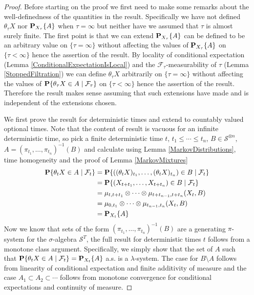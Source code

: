 \begin{proof}
Before starting on the proof we first need to make some remarks about
the well-definedness of the quantities in the result.  Specifically we
have not defined $\theta_\tau X$ nor $\sprobability{A}{X_\tau}$ when $\tau = \infty$ but neither have
we assumed that $\tau$ is almost surely finite.  The first point is that we
can extend $\sprobability{A}{X_\tau}$ can be defined to be an
arbitrary value on $\lbrace \tau = \infty \rbrace$ without affecting
the values of $\sprobability{A}{X_\tau}$ on $\lbrace \tau < \infty
\rbrace$ hence the assertion of the result.  By locality of
conditional expectation (Lemma \ref{ConditionalExpectationIsLocal})
and the $\mathcal{F}_\tau$-measurability of
$\tau$ (Lemma
\ref{StoppedFiltration}) we can define $\theta_\tau X$ arbitrarily on $\lbrace \tau =
\infty \rbrace$ without affecting the values of
$\cprobability{\mathcal{F}_\tau}{\theta_\tau X \in A}$ on $\lbrace \tau < \infty
\rbrace$ hence the assertion of the result.  Therefore the result
makes sense assuming that such extensions have made and is independent
of the extensions chosen.

We first prove the result for deterministic times and extend to
countably valued optional times.  Note that the content of result is
vacuous for an infinite deterministic time, so pick a finite
deterministic time $t$, $t_1
\leq \cdots \leq t_n$, $B \in \mathcal{S}^{\otimes n}$, $A =
(\pi_{t_1}, \dotsc, \pi_{t_n})^{-1}(B)$ and
calculate using Lemma \ref{MarkovDistributions}, time homogeneity and
the proof of Lemma \ref{MarkovMixtures}
\begin{align*}
\cprobability{\mathcal{F}_t}{\theta_t X \in A} &=
\cprobability{\mathcal{F}_t}{((\theta_t X)_{t_1}, \dotsc,
  (\theta_t X)_{t_n}) \in B} \\
&= \cprobability{\mathcal{F}_t}{(X_{t
    + t_1}, \dotsc, X_{t+ t_n}) \in B} \\
&= \mu_{t, t + t_1} \otimes \cdots \otimes \mu_{t+t_{n-1}, t+t_n}(X_t,
B) \\
&=\mu_{0, t_1} \otimes \cdots \otimes \mu_{t_{n-1}, t_n}(X_t, B) \\
&= \sprobability {A}{X_t}
\end{align*}
Now we know that sets of the form 
$(\pi_{t_1}, \dotsc, \pi_{t_n})^{-1}(B)$ are a
generating $\pi$-system for the $\sigma$-algebra $\mathcal{S}^T$,
the full result for deterministic times $t$ follows from a monotone
class argument.  Specifically, we simply show that the set of $A$ such that
$\cprobability{\mathcal{F}_t}{\theta_t X \in A} =
\sprobability{A}{X_t}$ a.s. is a $\lambda$-system.  The case for $B
\setminus A$ follows from linearity of conditional expectation and
finite additivity of measure and the case $A_1 \subset A_2 \subset
\cdots$ follows from monotone convergence for conditional expectations
and continuity of measure.


\end{proof}
